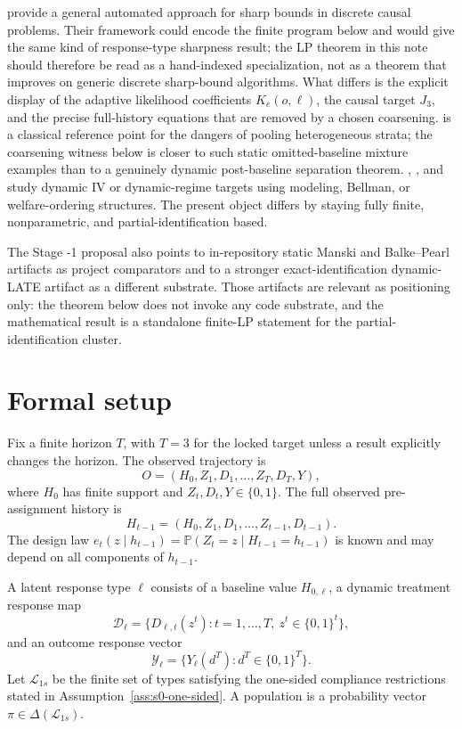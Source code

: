\documentclass[11pt]{article}
\renewcommand{\Pr}{\mathbb{P}}
\theoremstyle{definition}
\theoremstyle{plain}
\theoremstyle{remark}
\begin{document}
\cite{DuarteFinkelsteinKnoxMummoloShpitser2024} provide a general automated approach for sharp bounds in discrete causal problems.  Their framework could encode the finite program below and would give the same kind of response-type sharpness result; the LP theorem in this note should therefore be read as a hand-indexed specialization, not as a theorem that improves on generic discrete sharp-bound algorithms.  What differs is the explicit display of the adaptive likelihood coefficients \(K_e(o,\ell)\), the causal target \(J_3\), and the precise full-history equations that are removed by a chosen coarsening.  \cite{Simpson1951} is a classical reference point for the dangers of pooling heterogeneous strata; the coarsening witness below is closer to such static omitted-baseline mixture examples than to a genuinely dynamic post-baseline separation theorem.  \cite{MichaelCuiLorchTchetgen2024}, \cite{ChenZhang2023}, and \cite{Han2024} study dynamic IV or dynamic-regime targets using modeling, Bellman, or welfare-ordering structures.  The present object differs by staying fully finite, nonparametric, and partial-identification based.

The Stage -1 proposal also points to in-repository static Manski and Balke--Pearl artifacts as project comparators and to a stronger exact-identification dynamic-LATE artifact as a different substrate.  Those artifacts are relevant as positioning only: the theorem below does not invoke any code substrate, and the mathematical result is a standalone finite-LP statement for the partial-identification cluster.

\section{Formal setup}
Fix a finite horizon \(T\), with \(T=3\) for the locked target unless a result explicitly changes the horizon.  The observed trajectory is
\[
O=(H_0,Z_1,D_1,\ldots,Z_T,D_T,Y),
\]
where \(H_0\) has finite support and \(Z_t,D_t,Y\in\{0,1\}\).  The full observed pre-assignment history is
\[
H_{t-1}=(H_0,Z_1,D_1,\ldots,Z_{t-1},D_{t-1}).
\]
The design law \(e_t(z\mid h_{t-1})=\Pr(Z_t=z\mid H_{t-1}=h_{t-1})\) is known and may depend on all components of \(h_{t-1}\).

A latent response type \(\ell\) consists of a baseline value \(H_{0,\ell}\), a dynamic treatment response map
\[
\mathcal D_\ell=\{D_{\ell,t}(z^t):t=1,\ldots,T,\ z^t\in\{0,1\}^t\},
\]
and an outcome response vector
\[
\mathcal Y_\ell=\{Y_\ell(d^T):d^T\in\{0,1\}^T\}.
\]
Let \(\mathcal L_{1s}\) be the finite set of types satisfying the one-sided compliance restrictions stated in Assumption~\ref{ass:s0-one-sided}.  A population is a probability vector \(\pi\in\Delta(\mathcal L_{1s})\).
\end{document}
